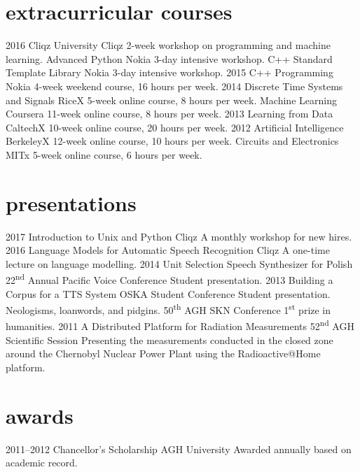 \documentclass[]{friggeri-cv_osx}
\begin{document}
\section{extracurricular courses}
\begin{entrylist}
\entry
{2016}
{Cliqz University}
{Cliqz}
{2-week workshop on programming and machine learning.}
\entry
{}
{Advanced Python}
{Nokia}
{3-day intensive workshop.}
\entry
{}
{C++ Standard Template Library}
{Nokia}
{3-day intensive workshop.}
\entry
{2015}
{C++ Programming}
{Nokia}
{4-week weekend course, 16 hours per week.}
\entry
{2014}
{Discrete Time Systems and Signals}
{RiceX}
{5-week online course, 8 hours per week.}
\entry
{}
{Machine Learning}
{Coursera}
{11-week online course, 8 hours per week.}
\entry
{2013}
{Learning from Data}
{CaltechX}
{10-week online course, 20 hours per week.}
\entry
{2012}
{Artificial Intelligence}
{BerkeleyX}
{12-week online course, 10 hours per week.}
\entry
{}
{Circuits and Electronics}
{MITx}
{5-week online course, 6 hours per week.\\}
\end{entrylist}


\section{presentations}
\begin{entrylist}
\entry
{2017}
{Introduction to Unix and Python}
{Cliqz}
{A monthly workshop for new hires.}
\entry
{2016}
{Language Models for Automatic Speech Recognition}
{Cliqz}
{A one-time lecture on language modelling.}
\entry
{2014}
{Unit Selection Speech Synthesizer for Polish}
{22\textsuperscript{nd} Annual Pacific Voice Conference}
{Student presentation.}
\entry
{2013}
{Building a Corpus for a TTS System}
{OSKA Student Conference}
{Student presentation.}
\entry
{}
{Neologisms, loanwords, and pidgins.}
{50\textsuperscript{th} AGH SKN Conference}
{1\textsuperscript{st} prize in humanities.}
\entry
{2011}
{A Distributed Platform for Radiation Measurements}
{52\textsuperscript{nd} AGH Scientific Session}
{Presenting the measurements conducted in the closed zone around the Chernobyl Nuclear Power Plant using the Radioactive@Home platform.}
\end{entrylist}


\section{awards}
\begin{entrylist}
\entry
{2011--2012}
{Chancellor's Scholarship}
{AGH University}
{Awarded annually based on academic record.}
\end{entrylist}
\end{document}
